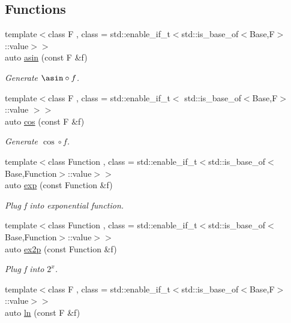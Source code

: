 \subsection*{Functions}
\begin{DoxyCompactItemize}
\item 
{\footnotesize template$<$class F , class  = std\-::enable\-\_\-if\-\_\-t$<$std\-::is\-\_\-base\-\_\-of$<$\-Base,\-F$>$\-::value$>$$>$ }\\auto \hyperlink{namespaceFunG_acad50a2dc3f66c49c11fe042aff730bc}{asin} (const F \&f)
\begin{DoxyCompactList}\small\item\em Generate $ \asin\circ f $. \end{DoxyCompactList}\item 
{\footnotesize template$<$class F , class  = std\-::enable\-\_\-if\-\_\-t$<$ std\-::is\-\_\-base\-\_\-of$<$\-Base,\-F$>$\-::value $>$$>$ }\\auto \hyperlink{namespaceFunG_a8056e4c23bd123525cf831bc9cb6eabb}{cos} (const F \&f)
\begin{DoxyCompactList}\small\item\em Generate $ \cos\circ f $. \end{DoxyCompactList}\item 
{\footnotesize template$<$class Function , class  = std\-::enable\-\_\-if\-\_\-t$<$std\-::is\-\_\-base\-\_\-of$<$\-Base,\-Function$>$\-::value$>$$>$ }\\auto \hyperlink{namespaceFunG_a00135c8521411f13813f9b972ea4e231}{exp} (const Function \&f)
\begin{DoxyCompactList}\small\item\em Plug f into exponential function. \end{DoxyCompactList}\item 
{\footnotesize template$<$class Function , class  = std\-::enable\-\_\-if\-\_\-t$<$std\-::is\-\_\-base\-\_\-of$<$\-Base,\-Function$>$\-::value$>$$>$ }\\auto \hyperlink{namespaceFunG_a7935591aef69987705c41f184d2b5531}{ex2p} (const Function \&f)
\begin{DoxyCompactList}\small\item\em Plug f into $2^x$. \end{DoxyCompactList}\item 
{\footnotesize template$<$class F , class  = std\-::enable\-\_\-if\-\_\-t$<$std\-::is\-\_\-base\-\_\-of$<$\-Base,\-F$>$\-::value$>$$>$ }\\auto \hyperlink{namespaceFunG_a2c299af519bdf3a07ce89be165ad7102}{ln} (const F \&f)

\end{DoxyCompactItemize}
